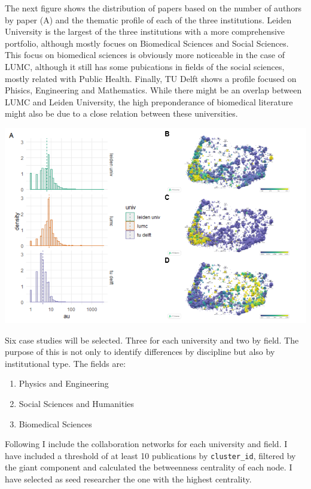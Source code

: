 \documentclass[]{elsarticle} %
\makeatletter
\providecommand{\tightlist}{%
  \setlength{\itemsep}{0pt}\setlength{\parskip}{0pt}}
\def\maxwidth{\ifdim\Gin@nat@width>\linewidth\linewidth
\else\Gin@nat@width\fi}
\let\Oldincludegraphics\includegraphics
\renewcommand{\includegraphics}[1]{\Oldincludegraphics[width=\maxwidth]{#1}}
\makeatother
\begin{document}
The next figure shows the distribution of papers based on the number of
authors by paper (A) and the thematic profile of each of the three
institutions. Leiden University is the largest of the three institutions
with a more comprehensive portfolio, although mostly focues on
Biomedical Sciences and Social Sciences. This focus on biomedical
sciences is obviously more noticeable in the case of LUMC, although it
still has some pubications in fields of the social sciences, mostly
related with Public Health. Finally, TU Delft shows a profile focused on
Phisics, Engineering and Mathematics. While there might be an overlap
between LUMC and Leiden University, the high preponderance of biomedical
literature might also be due to a close relation between these
universities.

\includegraphics{figs/histogram-profiles.png}

Six case studies will be selected. Three for each university and two by
field. The purpose of this is not only to identify differences by
discipline but also by institutional type. The fields are:

\begin{enumerate}
\def\labelenumi{\arabic{enumi}.}
\tightlist
\item
  Physics and Engineering
\item
  Social Sciences and Humanities
\item
  Biomedical Sciences
\end{enumerate}

Following I include the collaboration networks for each university and
field. I have included a threshold of at least 10 publications by
\texttt{cluster\_id}, filtered by the giant component and calculated the
betweenness centrality of each node. I have selected as seed researcher
the one with the highest centrality.
\end{document}
